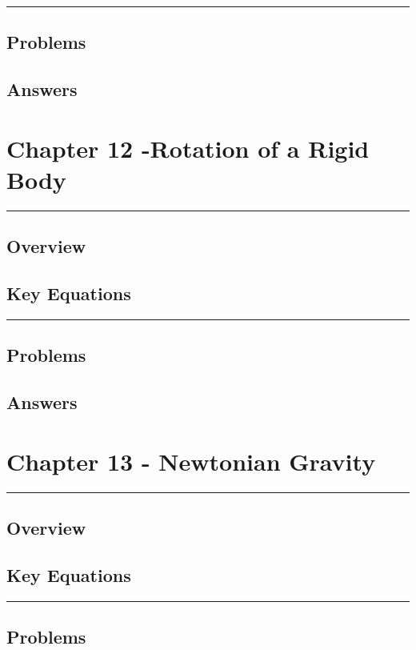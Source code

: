 \documentclass[a4paper,12pt]{article}
\begin{document}
\begin{center}
  \rule{6cm}{0.5pt}
\end{center}
\subsection*{Problems}
\subsection*{Answers}

\pagebreak
\section*{Chapter 12 -Rotation of a Rigid Body}
\rule{\linewidth}{1pt}
\subsection*{Overview}
\subsection*{Key Equations}

\begin{center}
  \rule{6cm}{0.5pt}
\end{center}
\subsection*{Problems}
\subsection*{Answers}

\pagebreak
\section*{Chapter 13 - Newtonian Gravity}
\rule{\linewidth}{1pt}
\subsection*{Overview}
\subsection*{Key Equations}

\begin{center}
  \rule{6cm}{0.5pt}
\end{center}
\subsection*{Problems}
\end{document}
